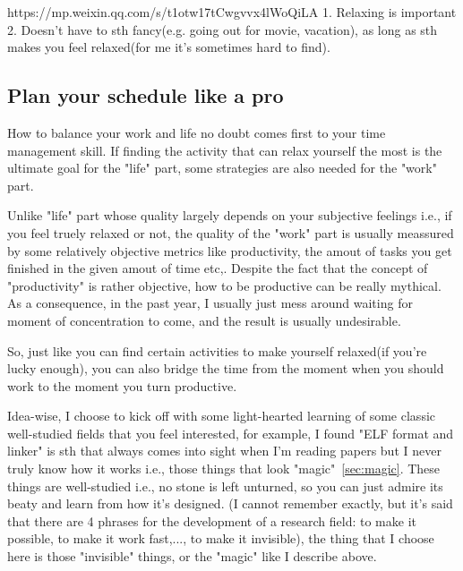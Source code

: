 https://mp.weixin.qq.com/s/t1otw17tCwgvvx4lWoQiLA
1. Relaxing is important
2. Doesn't have to sth fancy(e.g. going out for movie, vacation), as long as sth makes you feel relaxed(for me it's sometimes hard to find).
\subsection{Plan your schedule like a pro}
How to balance your work and life no doubt comes first to your time management skill. 
If finding the activity that can relax yourself the most is the ultimate goal for the "life" part, 
some strategies are also needed for the "work" part.

Unlike "life" part whose quality largely depends on your subjective feelings i.e., if you feel truely relaxed or not, the quality of the "work" part is usually
meassured by some relatively objective metrics like productivity, the amout of tasks you get finished in the given amout of time etc,.
Despite the fact that the concept of "productivity" is rather objective, how to be productive can be really mythical. 
As a consequence, in the past year, I usually just mess around waiting for moment of concentration to come, and the result is usually undesirable.

So, just like you can find certain activities to make yourself relaxed(if you're lucky enough), you can also bridge the time from the moment when you should work
to the moment you turn productive. 

Idea-wise, I choose to kick off with some light-hearted learning of some classic well-studied fields that you feel interested, 
for example, I found "ELF format and linker" is sth that always comes into sight when I'm reading papers but I never truly know how it works
i.e., those things that look "magic"~\ref{sec:magic}. These things are well-studied i.e., no stone is left unturned, 
so you can just admire its beaty and learn from how it's designed.
(I cannot remember exactly, but it's said that there are 4 phrases for the development of a research field: to make it possible, to make it work fast,..., to make it invisible),
the thing that I choose here is those "invisible" things, or the "magic" like I describe above.